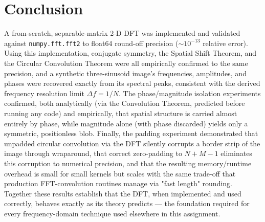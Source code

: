 \documentclass[11pt]{article}
\begin{document}
\section{Conclusion}

A from-scratch, separable-matrix 2-D DFT was implemented and validated against
\texttt{numpy.fft.fft2} to float64 round-off precision ($\sim\!10^{-13}$ relative error). Using
this implementation, conjugate symmetry, the Spatial Shift Theorem, and the Circular Convolution
Theorem were all empirically confirmed to the same precision, and a synthetic three-sinusoid
image's frequencies, amplitudes, and phases were recovered exactly from its spectral peaks,
consistent with the derived frequency resolution limit $\Delta f = 1/N$. The phase/magnitude
isolation experiments confirmed, both analytically (via the Convolution Theorem, predicted before
running any code) and empirically, that spatial structure is carried almost entirely by phase,
while magnitude alone (with phase discarded) yields only a symmetric, positionless blob. Finally,
the padding experiment demonstrated that unpadded circular convolution via the DFT silently
corrupts a border strip of the image through wraparound, that correct zero-padding to $N+M-1$
eliminates this corruption to numerical precision, and that the resulting memory/runtime overhead
is small for small kernels but scales with the same trade-off that production FFT-convolution
routines manage via "fast length" rounding. Together these results establish that the DFT, when
implemented and used correctly, behaves exactly as its theory predicts — the foundation required
for every frequency-domain technique used elsewhere in this assignment.
\end{document}
